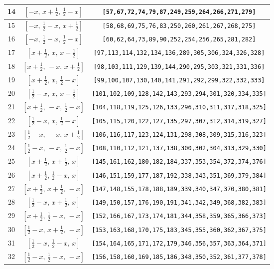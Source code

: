 \documentclass[fleqn,8pt]{jsarticle}
\begin{document}
\begin{longtable}{ccc}
14 & $\left[ - x,\, x + \frac{1}{2},\, \frac{1}{2} - x \right]$ & {\tt [57,67,72,74,79,87,249,259,264,266,271,279]} \\ \hline
15 & $\left[ - x,\, \frac{1}{2} - x,\, x + \frac{1}{2} \right]$ & {\tt [58,68,69,75,76,83,250,260,261,267,268,275]} \\ \hline
16 & $\left[ - x,\, \frac{1}{2} - x,\, \frac{1}{2} - x \right]$ & {\tt [60,62,64,73,89,90,252,254,256,265,281,282]} \\ \hline
17 & $\left[ x + \frac{1}{2},\, x,\, x + \frac{1}{2} \right]$ & {\tt [97,113,114,132,134,136,289,305,306,324,326,328]} \\ \hline
18 & $\left[ x + \frac{1}{2},\, - x,\, x + \frac{1}{2} \right]$ & {\tt [98,103,111,129,139,144,290,295,303,321,331,336]} \\ \hline
19 & $\left[ x + \frac{1}{2},\, x,\, \frac{1}{2} - x \right]$ & {\tt [99,100,107,130,140,141,291,292,299,322,332,333]} \\ \hline
20 & $\left[ \frac{1}{2} - x,\, x,\, x + \frac{1}{2} \right]$ & {\tt [101,102,109,128,142,143,293,294,301,320,334,335]} \\ \hline
21 & $\left[ x + \frac{1}{2},\, - x,\, \frac{1}{2} - x \right]$ & {\tt [104,118,119,125,126,133,296,310,311,317,318,325]} \\ \hline
22 & $\left[ \frac{1}{2} - x,\, x,\, \frac{1}{2} - x \right]$ & {\tt [105,115,120,122,127,135,297,307,312,314,319,327]} \\ \hline
23 & $\left[ \frac{1}{2} - x,\, - x,\, x + \frac{1}{2} \right]$ & {\tt [106,116,117,123,124,131,298,308,309,315,316,323]} \\ \hline
24 & $\left[ \frac{1}{2} - x,\, - x,\, \frac{1}{2} - x \right]$ & {\tt [108,110,112,121,137,138,300,302,304,313,329,330]} \\ \hline
25 & $\left[ x + \frac{1}{2},\, x + \frac{1}{2},\, x \right]$ & {\tt [145,161,162,180,182,184,337,353,354,372,374,376]} \\ \hline
26 & $\left[ x + \frac{1}{2},\, \frac{1}{2} - x,\, x \right]$ & {\tt [146,151,159,177,187,192,338,343,351,369,379,384]} \\ \hline
27 & $\left[ x + \frac{1}{2},\, x + \frac{1}{2},\, - x \right]$ & {\tt [147,148,155,178,188,189,339,340,347,370,380,381]} \\ \hline
28 & $\left[ \frac{1}{2} - x,\, x + \frac{1}{2},\, x \right]$ & {\tt [149,150,157,176,190,191,341,342,349,368,382,383]} \\ \hline
29 & $\left[ x + \frac{1}{2},\, \frac{1}{2} - x,\, - x \right]$ & {\tt [152,166,167,173,174,181,344,358,359,365,366,373]} \\ \hline
30 & $\left[ \frac{1}{2} - x,\, x + \frac{1}{2},\, - x \right]$ & {\tt [153,163,168,170,175,183,345,355,360,362,367,375]} \\ \hline
31 & $\left[ \frac{1}{2} - x,\, \frac{1}{2} - x,\, x \right]$ & {\tt [154,164,165,171,172,179,346,356,357,363,364,371]} \\ \hline
32 & $\left[ \frac{1}{2} - x,\, \frac{1}{2} - x,\, - x \right]$ & {\tt [156,158,160,169,185,186,348,350,352,361,377,378]} \\
\end{longtable}
\end{document}
